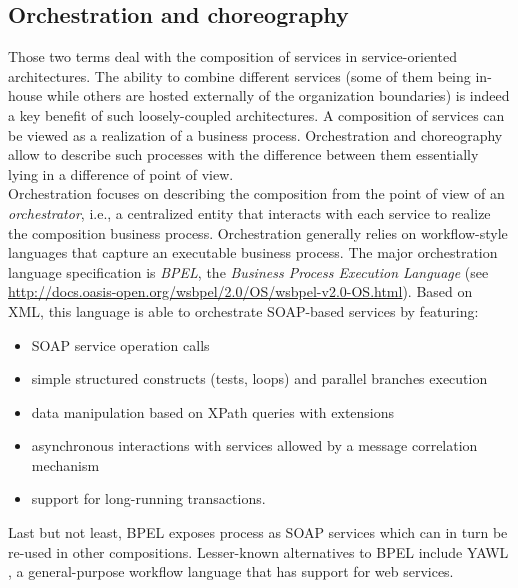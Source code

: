 \subsection{Orchestration and choreography}


Those two terms deal with the composition of services in service-oriented architectures. The ability to combine different services (some of them being in-house while others are hosted externally of the organization boundaries) is indeed a key benefit of such loosely-coupled architectures. A composition of services can be viewed as a realization of a business process. Orchestration and choreography allow to describe such processes with the difference between them essentially lying in a difference of point of view.\\

Orchestration focuses on describing the composition from the point of view of an \emph{orchestrator}, i.e., a centralized entity that interacts with each service to realize the composition business process. Orchestration generally relies on workflow-style languages that capture an executable business process. The major orchestration language specification is \emph{BPEL}, the \emph{Business Process Execution Language} (see \url{http://docs.oasis-open.org/wsbpel/2.0/OS/wsbpel-v2.0-OS.html}). Based on XML, this language is able to orchestrate SOAP-based services  by featuring:
\begin{itemize}
  
  \item SOAP service operation calls
  
  \item simple structured constructs (tests, loops) and parallel branches execution
  
  \item data manipulation based on XPath queries with extensions
  
  \item asynchronous interactions with services allowed by a message correlation mechanism
  
  \item support for long-running transactions.
  
\end{itemize}
Last but not least, BPEL exposes process as SOAP services which can in turn be re-used in other compositions. Lesser-known alternatives to BPEL include YAWL \cite{AalstADH04,AalstH05}, a general-purpose workflow language that has support for web services.\\

